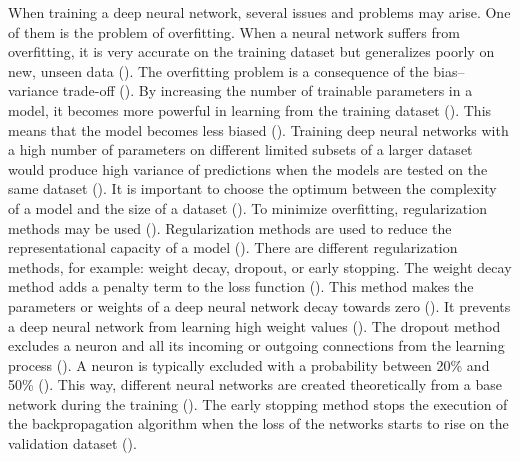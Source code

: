 \documentclass{BachelorBUI}
\begin{document}
                When training a deep neural network, several issues and problems may arise. One of them is the problem of overfitting. When a neural network suffers from overfitting, it is very accurate on the training dataset but generalizes poorly on new, unseen data (\cite{Aggarwal:2018}). The overfitting problem is a consequence of the bias--variance trade-off (\cite{Aggarwal:2018}). By increasing the number of trainable parameters in a model, it becomes more powerful in learning from the training dataset (\cite{Aggarwal:2018}). This means that the model becomes less biased (\cite{Aggarwal:2018}). Training deep neural networks with a high number of parameters on different limited subsets of a larger dataset would produce high variance of predictions when the models are tested on the same dataset (\cite{Aggarwal:2018}). It is important to choose the optimum between the complexity of a model and the size of a dataset (\cite{Aggarwal:2018}). To minimize overfitting, regularization methods may be used (\cite{Aggarwal:2018}). Regularization methods are used to reduce the representational capacity of a model (\cite{Goodfellow:2016}). There are different regularization methods, for example: weight decay, dropout, or early stopping. The weight decay method adds a penalty term to the loss function (\cite{Bishop:2024}). This method makes the parameters or weights of a deep neural network decay towards zero (\cite{Bishop:2024}). It prevents a deep neural network from learning high weight values (\cite{Bishop:2024}). The dropout method excludes a neuron and all its incoming or outgoing connections from the learning process (\cite{Aggarwal:2018}). A neuron is typically excluded with a probability between 20\% and 50\% (\cite{Aggarwal:2018}). This way, different neural networks are created theoretically from a base network during the training (\cite{Aggarwal:2018}). The early stopping method stops the execution of the backpropagation algorithm when the loss of the networks starts to rise on the validation dataset (\cite{Murphy:2022}).
\end{document}
